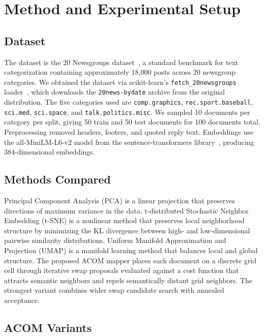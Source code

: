 \section{Method and Experimental Setup}

\subsection{Dataset}

The dataset is the 20 Newsgroups dataset~\cite{lang1995newsweeder}, a standard benchmark for text categorization containing approximately 18,000 posts across 20 newsgroup categories. We obtained the dataset via scikit-learn's \texttt{fetch\_20newsgroups} loader~\cite{pedregosa2011sklearn}, which downloads the \texttt{20news-bydate} archive from the original distribution. The five categories used are \mbox{\texttt{comp.graphics}}, \mbox{\texttt{rec.sport.baseball}}, \mbox{\texttt{sci.med}}, \mbox{\texttt{sci.space}}, and \mbox{\texttt{talk.politics.misc}}. We sampled 10 documents per category per split, giving 50 train and 50 test documents for 100 documents total. Preprocessing removed headers, footers, and quoted reply text. Embeddings use the all-MiniLM-L6-v2 model from the sentence-transformers library~\cite{reimers2019sentencebert}, producing 384-dimensional embeddings.

\subsection{Methods Compared}

Principal Component Analysis (PCA) \cite{pearson1901pca} is a linear projection that preserves directions of maximum variance in the data. t-distributed Stochastic Neighbor Embedding (t-SNE) \cite{vandermaaten2008tsne} is a nonlinear method that preserves local neighborhood structure by minimizing the KL divergence between high- and low-dimensional pairwise similarity distributions. Uniform Manifold Approximation and Projection (UMAP) \cite{mcinnes2018umap} is a manifold learning method that balances local and global structure. The proposed ACOM mapper places each document on a discrete grid cell through iterative swap proposals evaluated against a cost function that attracts semantic neighbors and repels semantically distant grid neighbors. The strongest variant combines wider swap candidate search with annealed acceptance.

\subsection{ACOM Variants}

